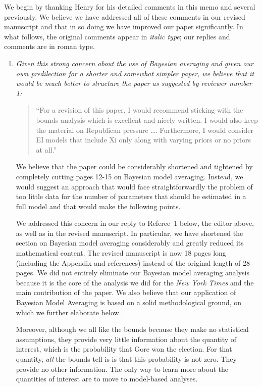 \documentclass[11pt]{article}
\begin{document}
We begin by thanking Henry for his detailed comments in this memo and
several previously.  We believe we have addressed all of these
comments in our revised manuscript and that in so doing we have
improved our paper significantly.  In what follows, the original
comments appear in \emph{italic type}; our replies and comments are in
roman type.

\bigskip
{}

\begin{enumerate}
  
\item {\it Given this strong concern about the use of Bayesian
    averaging and given our own predilection for a shorter and
    somewhat simpler paper, we believe that it would be much better to
    structure the paper as suggested by reviewer number 1:
    \begin{quote}
      ``For a revision of this paper, I would recommend sticking with
      the bounds analysis which is excellent and nicely written.  I
      would also keep the material on Republican pressure \ldots.
      Furthermore, I would consider EI models that include Xi only along
      with varying priors or no priors at all.''
    \end{quote}
    We believe that the paper could be considerably shortened and
    tightened by completely cutting pages 12-15 on Bayesian model
    averaging.  Instead, we would suggest an approach that would face
    straightforwardly the problem of too little data for the number of
    parameters that should be estimated in a full model and that would
    make the following points.}
  
  We addressed this concern in our reply to Referee~1 below, the
  editor above, as well as in the revised manuscript.  In particular,
  we have shortened the section on Bayesian model averaging
  considerably and greatly reduced its mathematical content.  The
  revised manuscript is now 18 pages long (including the Appendix and
  references) instead of the original length of 28 pages. We did not
  entirely eliminate our Bayesian model averaging analysis because it
  is the core of the analysis we did for the {\it New York Times} and
  the main contribution of the paper.  We also believe that our
  application of Bayesian Model Averaging is based on a solid
  methodological ground, on which we further elaborate below.
  
  Moreover, although we all like the bounds because they make no
  statistical assumptions, they provide very little information about
  the quantity of interest, which is the probability that Gore won the
  election.  For that quantity, \emph{all} the bounds tell is is that
  this probability is not zero.  They provide no other information.
  The only way to learn more about the quantities of interest are to
  move to model-based analyses.
  

\end{enumerate}
\end{document}
